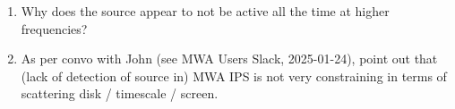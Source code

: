 \documentclass[preprint2,linenumbers]{aastex631}
\begin{document}


\begin{enumerate}
        \item Why does the source appear to not be active all the time at higher frequencies?
              \item As per convo with John (see MWA Users Slack, 2025-01-24), point out that (lack of detection of source in) MWA IPS is not very constraining in terms of scattering disk / timescale / screen.
\end{enumerate}
\end{document}

